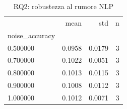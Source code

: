 \begin{table}[h]
\centering
\begin{tabular}{lrrr}
\toprule
 & mean & std & n \\
noise_accuracy &  &  &  \\
\midrule
0.500000 & 0.0958 & 0.0179 & 3 \\
0.700000 & 0.1022 & 0.0051 & 3 \\
0.800000 & 0.1013 & 0.0115 & 3 \\
0.900000 & 0.1008 & 0.0112 & 3 \\
1.000000 & 0.1012 & 0.0071 & 3 \\
\bottomrule
\end{tabular}
\caption{RQ2: robustezza al rumore NLP}
\label{tab:rq2_summary}
\end{table}
